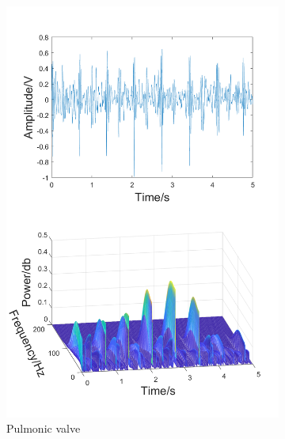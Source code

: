 \begin{figure}[h]
\begin{subfigure}{.3\linewidth}
        \includegraphics[width=1\linewidth]{figs/disscussion/c.png}
        \caption{Pulmonic valve}
        \label{FIG:Time&Frequency.c}
    \end{subfigure}\\
    \begin{subfigure}{.4\linewidth}
        \centering

\end{subfigure}
\end{figure}
